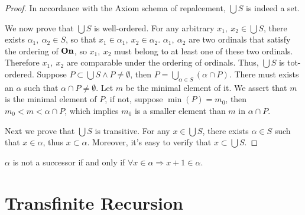 \begin{proof}
  In accordance with the Axiom schema of repalcement, $\bigcup S$ is indeed a set. 

  We now prove that $\bigcup S$ is well-ordered. For any arbitrary $x_1,\ x_2 \in \bigcup S$, there exists $\alpha_1,\ \alpha_2 \in S$, so that $x_1 \in \alpha_1, \ x_2 \in \alpha_2$. 
  $\alpha_1,\ \alpha_2$ are two ordinals that satisfy the ordering of $\boldsymbol{\mathrm{On}}$, so $x_1, \ x_2$ must belong to at least one of these two ordinals. Therefore $x_1, \ x_2$ are comparable under the ordering of ordinals. Thus, $\bigcup S$ is tot-ordered. Suppose $P \subset \bigcup S \wedge P \neq \emptyset $, then $P = \bigcup_{\alpha \in S} (\alpha \cap P)$. There must exists an $\alpha$ such that $\alpha \cap P \neq \emptyset$. Let $m$ be the minimal element of it. We assert that $m$ is the minimal element of $P$, if not, suppose $\min(P) = m_0$, then $m_0 < m < \alpha \cap P$, which implies $m_0$ is a smaller element than $m$ in $\alpha \cap P$.
  

  Next we prove that $\bigcup S$ is transitive. For any $x \in \bigcup S$, there exists $\alpha \in S $ such that $x \in \alpha$, thus $x \subset \alpha$. Moreover, it's easy to verify that $x \subset \bigcup S$.
\end{proof}





\begin{proposition}
  $\alpha$ is not a successor if and only if $\forall x \in \alpha \Rightarrow x+1 \in \alpha$.
\end{proposition}





\section{Transfinite Recursion}


